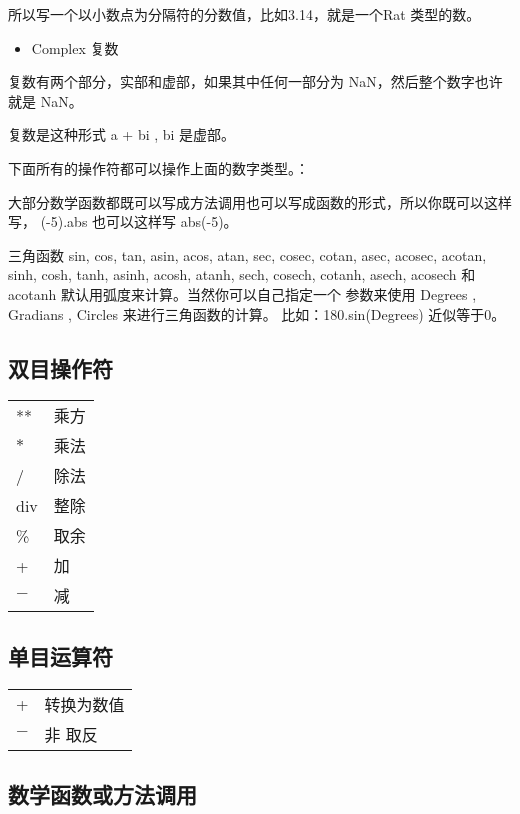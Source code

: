 \documentclass{ctexart}
\begin{document}
所以写一个以小数点为分隔符的分数值，比如3.14，就是一个Rat 类型的数。

\begin{itemize}
\item Complex 复数
\end{itemize}
复数有两个部分，实部和虚部，如果其中任何一部分为 NaN，然后整个数字也许就是 NaN。

复数是这种形式 a + bi , bi 是虚部。

下面所有的操作符都可以操作上面的数字类型。：

大部分数学函数都既可以写成方法调用也可以写成函数的形式，所以你既可以这样写，
(-5).abs 也可以这样写 abs(-5)。

三角函数 sin, cos, tan, asin, acos, atan, sec, cosec, cotan, asec, 
acosec, acotan, sinh, cosh, tanh, asinh, acosh, atanh, sech, cosech,
 cotanh, asech, acosech 和 acotanh 默认用弧度来计算。当然你可以自己指定一个
参数来使用 Degrees , Gradians , Circles 来进行三角函数的计算。
比如：180.sin(Degrees) 近似等于0。
\subsection{双目操作符}
\label{sec-3-1}


\begin{center}
\begin{tabular}{ll}
 **   &  乘方  \\
 $*$  &  乘法  \\
 /    &  除法  \\
 div  &  整除  \\
 \%   &  取余  \\
 +    &  加    \\
 $-$  &  减    \\
\end{tabular}
\end{center}
\subsection{单目运算符}
\label{sec-3-2}


\begin{center}
\begin{tabular}{ll}
 +    &  转换为数值  \\
 $-$  &  非 取反     \\
\end{tabular}
\end{center}
\subsection{数学函数或方法调用}
\label{sec-3-3}
\end{document}
